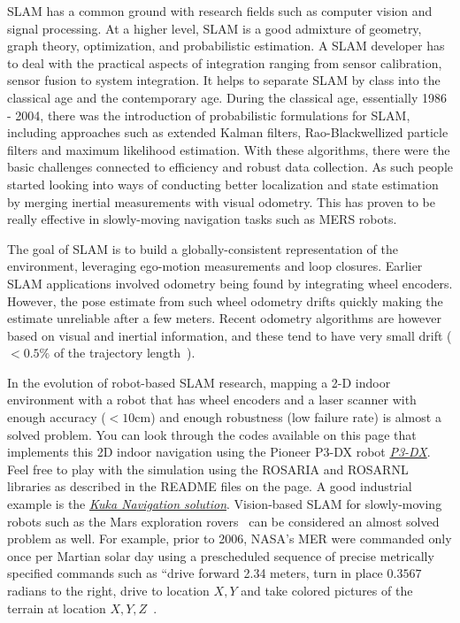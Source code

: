 SLAM has a common ground with research fields such as computer vision and signal processing. At a higher level, SLAM is a good admixture of geometry, graph theory, optimization, and probabilistic estimation. A SLAM developer has to deal with the practical aspects of integration ranging from sensor calibration, sensor fusion to system integration. It helps to separate SLAM by class into the classical age and the contemporary age. During the classical age, essentially 1986 - 2004, there was the introduction of probabilistic formulations for SLAM, including approaches such as extended Kalman filters, Rao-Blackwellized particle filters and maximum likelihood estimation. With these algorithms, there were the basic challenges connected to efficiency and robust data collection. As such people started looking into ways of conducting better localization and state estimation by merging inertial measurements with visual odometry. This has proven to be really effective in slowly-moving navigation tasks such as MERS robots. %
 
 The goal of SLAM is to build a globally-consistent representation of the environment, leveraging ego-motion measurements and loop closures. Earlier SLAM applications involved odometry being found by integrating wheel encoders. However, the pose estimate from such wheel odometry drifts quickly making the estimate unreliable after a few meters. Recent odometry algorithms are however based on visual and inertial information, and these tend to have very small drift ($< 0.5\%$ of the trajectory length~\cite{SLAMLeonard}). 
 
 In the evolution of robot-based SLAM research, mapping a 2-D indoor environment with a robot that has wheel encoders and a laser scanner with enough accuracy ($< 10$cm) and enough robustness (\eg low failure rate) is almost a solved problem. You can look through the codes available on this page that implements this 2D indoor navigation using the Pioneer P3-DX robot \href{https://github.com/SeRViCE-Lab/p3-dx}{\textit{P3-DX}}. Feel free to play with the simulation using the ROSARIA and ROSARNL libraries as described in the README files on the page. A good industrial example is the \href{https://www.kuka.com/-/media/kuka-downloads/imported/9cb8e311bfd744b4b0eab25ca883f6d3/kuka_navigation_solution_en.pdf}{\textit{Kuka Navigation solution}}. Vision-based SLAM for slowly-moving robots such as the Mars exploration  rovers~\cite{MarsVisualOdometry} can be considered an almost solved problem as well. For example, prior to 2006, NASA's MER were commanded only once per Martian solar day using a prescheduled sequence of precise metrically specified commands such as ``drive forward 2.34 meters, turn in place $0.3567$ radians to the right, drive to location $X, Y$ and take colored pictures of the terrain at location $X,Y, Z$~\cite{leger2005mars}.

